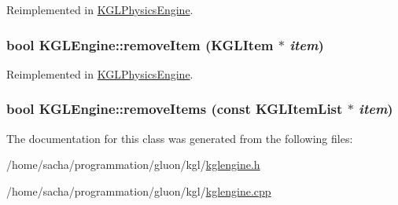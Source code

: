 Reimplemented in \hyperlink{class_k_g_l_physics_engine_b72358d3b45888792d7c4e91715d29b4}{KGLPhysicsEngine}.\hypertarget{class_k_g_l_engine_533f3324f67dcda39192365e2eab40c3}{
\subsubsection[{removeItem}]{\setlength{\rightskip}{0pt plus 5cm}bool KGLEngine::removeItem ({\bf KGLItem} $\ast$ {\em item})}}
\label{class_k_g_l_engine_533f3324f67dcda39192365e2eab40c3}




Reimplemented in \hyperlink{class_k_g_l_physics_engine_c5e88c0ab7ec1923038fdcb36ffdb192}{KGLPhysicsEngine}.\hypertarget{class_k_g_l_engine_11d424c95a9adf619c36627a6d509072}{
\subsubsection[{removeItems}]{\setlength{\rightskip}{0pt plus 5cm}bool KGLEngine::removeItems (const {\bf KGLItemList} $\ast$ {\em item})}}
\label{class_k_g_l_engine_11d424c95a9adf619c36627a6d509072}




The documentation for this class was generated from the following files:\begin{CompactItemize}
\item 
/home/sacha/programmation/gluon/kgl/\hyperlink{kglengine_8h}{kglengine.h}\item 
/home/sacha/programmation/gluon/kgl/\hyperlink{kglengine_8cpp}{kglengine.cpp}\end{CompactItemize}

